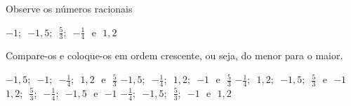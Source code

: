 Observe os números racionais

\vspace{-4mm}\begin{center}
$-1$;\,\, $-1{,}5$;\,\, $\frac{5}{3}$;\,\, $-\frac{1}{4}$\,\, e\,\, $1{,}2$

\end{center}\vspace{-4mm}
Compare-os e coloque-os em ordem crescente, ou seja, do menor para o maior.

$-1{,}5$;\,\, $-1$;\,\, $-\frac{1}{4}$;\,\, $1{,}2$\,\, e\,\, $\frac{5}{3}$
$-1{,}5$;\,\, $-\frac{1}{4}$;\,\, $1{,}2$;\,\, $-1$\,\, e\,\, $\frac{5}{3}$
$-\frac{1}{4}$;\,\, $1{,}2$;\,\, $-1{,}5$;\,\, $\frac{5}{3}$\,\, e\,\, $-1$
$1{,}2$;\,\, $\frac{5}{3}$;\,\, $-\frac{1}{4}$;\,\, $-1{,}5$\,\, e\,\, $-1$
$-\frac{1}{4}$;\,\, $-1{,}5$;\,\, $\frac{5}{3}$;\,\, $-1$\,\, e\,\, $1{,}2$




